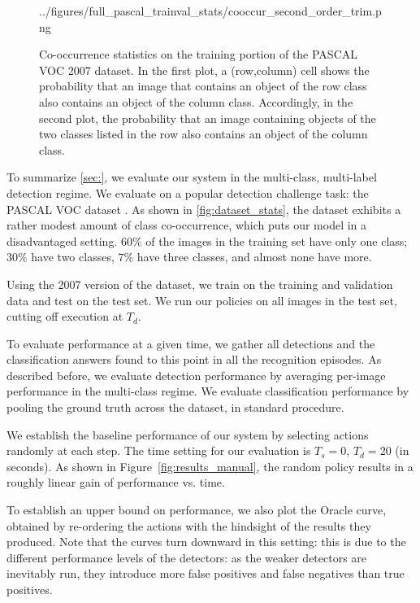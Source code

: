 \begin{figure}[h!]
{    {../figures/full_pascal_trainval_stats/cooccur_second_order_trim.png}}
  \caption{
  Co-occurrence statistics on the training portion of the PASCAL VOC 2007 dataset.
  In the first plot, a (row,column) cell shows the probability that an image that contains an object of the row class also contains an object of the column class.
  Accordingly, in the second plot, the probability that an image containing objects of the two classes listed in the row also contains an object of the column class.
  }
  \label{fig:dataset_stats}
\end{figure}

To summarize \autoref{sec:}, we evaluate our system in the multi-class, multi-label detection regime.
We evaluate on a popular detection challenge task: the PASCAL VOC dataset \cite{pascal-voc-2010}.
As shown in \autoref{fig:dataset_stats}, the dataset exhibits a rather modest amount of class co-occurrence, which puts our model in a disadvantaged setting.
$60\%$ of the images in the training set have only one class; $30\%$ have two classes, $7\%$ have three classes, and almost none have more.

Using the 2007 version of the dataset, we train on the training and validation data and test on the test set.
We run our policies on all images in the test set, cutting off execution at $T_d$.

To evaluate performance at a given time, we gather all detections and the classification answers found to this point in all the recognition episodes.
As described before, we evaluate detection performance by averaging per-image performance in the multi-class regime.
We evaluate classification performance by pooling the ground truth across the dataset, in standard procedure.

We establish the baseline performance of our system by selecting actions randomly at each step.
The time setting for our evaluation is $T_s=0$, $T_d=20$ (in seconds).
As shown in Figure~\ref{fig:results_manual}, the random policy results in a roughly linear gain of performance vs. time.

To establish an upper bound on performance, we also plot the Oracle curve, obtained by re-ordering the actions with the hindsight of the results they produced.
Note that the curves turn downward in this setting: this is due to the different performance levels of the detectors: as the weaker detectors are inevitably run, they introduce more false positives and false negatives than true positives.

